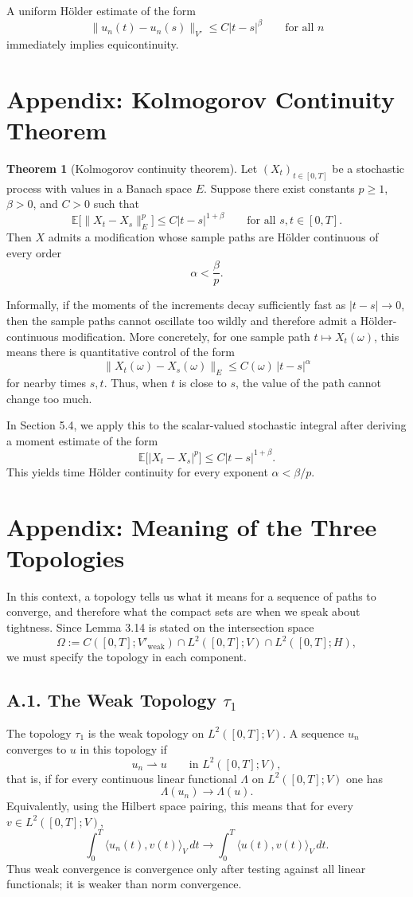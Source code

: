 \documentclass[11pt]{article}
\theoremstyle{definition}
\newtheorem{theorem}{Theorem}
\theoremstyle{remark}
\begin{document}
A uniform H\"older estimate of the form
\[
  \|u_n(t)-u_n(s)\|_{V'}
  \le
  C|t-s|^\beta
  \qquad \text{for all } n
\]
immediately implies equicontinuity.

\section*{Appendix: Kolmogorov Continuity Theorem}
\begin{theorem}[Kolmogorov continuity theorem]
Let $(X_t)_{t\in[0,T]}$ be a stochastic process with values in a Banach space $E$. Suppose there exist constants $p\ge 1$, $\beta>0$, and $C>0$ such that
\[
  \mathbb E\bigl[\|X_t-X_s\|_E^p\bigr]
  \le
  C|t-s|^{1+\beta}
  \qquad \text{for all } s,t\in[0,T].
\]
Then $X$ admits a modification whose sample paths are H\"older continuous of every order
\[
  \alpha<\frac{\beta}{p}.
\]
\end{theorem}

Informally, if the moments of the increments decay sufficiently fast as $|t-s|\to 0$, then the sample paths cannot oscillate too wildly and therefore admit a H\"older-continuous modification. More concretely, for one sample path $t\mapsto X_t(\omega)$, this means there is quantitative control of the form
\[
  \|X_t(\omega)-X_s(\omega)\|_E
  \le
  C(\omega)\,|t-s|^\alpha
\]
for nearby times $s,t$. Thus, when $t$ is close to $s$, the value of the path cannot change too much.

In Section 5.4, we apply this to the scalar-valued stochastic integral after deriving a moment estimate of the form
\[
  \mathbb E\bigl[|X_t-X_s|^p\bigr]\le C|t-s|^{1+\beta}.
\]
This yields time H\"older continuity for every exponent $\alpha<\beta/p$.

\section*{Appendix: Meaning of the Three Topologies}
In this context, a topology tells us what it means for a sequence of paths to converge, and therefore what the compact sets are when we speak about tightness. Since Lemma 3.14 is stated on the intersection space
\[
  \Omega:=C([0,T];V'_{\mathrm{weak}})\cap L^2([0,T];V)\cap L^2([0,T];H),
\]
we must specify the topology in each component.

\subsection*{A.1. The Weak Topology $\tau_1$}
The topology $\tau_1$ is the weak topology on $L^2([0,T];V)$. A sequence $u_n$ converges to $u$ in this topology if
\[
  u_n\rightharpoonup u
  \qquad \text{in } L^2([0,T];V),
\]
that is, if for every continuous linear functional $\Lambda$ on $L^2([0,T];V)$ one has
\[
  \Lambda(u_n)\to \Lambda(u).
\]
Equivalently, using the Hilbert space pairing, this means that for every $v\in L^2([0,T];V)$,
\[
  \int_0^T \langle u_n(t),v(t)\rangle_V\,dt
  \to
  \int_0^T \langle u(t),v(t)\rangle_V\,dt.
\]
Thus weak convergence is convergence only after testing against all linear functionals; it is weaker than norm convergence.
\end{document}
